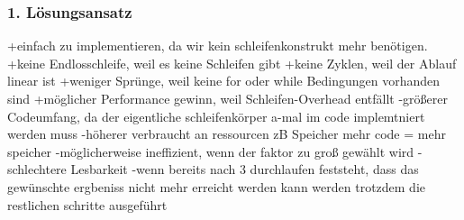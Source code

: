 \documentclass{article}
\begin{document}
    \subsubsection{1. Lösungsansatz}
    +einfach zu implementieren, da wir kein schleifenkonstrukt mehr benötigen.
    +keine Endlosschleife, weil es keine Schleifen gibt
    +keine Zyklen, weil der Ablauf linear ist
    +weniger Sprünge, weil keine for oder while Bedingungen vorhanden sind
    +möglicher Performance gewinn, weil Schleifen-Overhead entfällt
    -größerer Codeumfang, da der eigentliche schleifenkörper a-mal im code implemtniert werden muss 
    -höherer verbraucht an ressourcen zB Speicher mehr code = mehr speicher
    -möglicherweise ineffizient, wenn der faktor zu groß gewählt wird
    -schlechtere Lesbarkeit
    -wenn bereits nach 3 durchlaufen feststeht, dass das gewünschte ergbeniss nicht mehr erreicht werden kann werden trotzdem die restlichen schritte ausgeführt
    \newpage
    \renewcommand{\refname}{}
\end{document}
